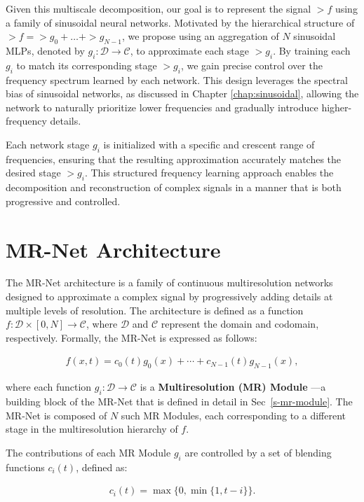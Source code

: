 Given this multiscale decomposition, our goal is to represent the signal $\gt{f}$ using a family of sinusoidal neural networks. Motivated by the hierarchical structure of $\gt{f}=\gt{g}_0+\dots+\gt{g}_{N-1}$, we propose using an aggregation of $N$ sinusoidal MLPs, denoted by $g_i:\mathcal{D}\to \mathcal{C}$, to approximate each stage $\gt{g}_i$. By training each $g_i$ to match its corresponding stage $\gt{g}_i$, we gain precise control over the frequency spectrum learned by each network. This design leverages the spectral bias of sinusoidal networks, as discussed in Chapter \ref{chap:sinusoidal}, allowing the network to naturally prioritize lower frequencies and gradually introduce higher-frequency details.

Each network stage $g_i$ is initialized with a specific and crescent range of frequencies, ensuring that the resulting approximation accurately matches the desired stage $\gt{g}_i$. This structured frequency learning approach enables the decomposition and reconstruction of complex signals in a manner that is both progressive and controlled.

\section{MR-Net Architecture}

The MR-Net architecture is a family of continuous multiresolution networks designed to approximate a complex signal by progressively adding details at multiple levels of resolution. The architecture is defined as a function \( f:\mathcal{D} \times [0,N] \to \mathcal{C} \), where \(\mathcal{D}\) and \(\mathcal{C}\) represent the domain and codomain, respectively. Formally, the MR-Net is expressed as follows:

\begin{align}\label{e-mrnet}
f(x,t) = c_0(t) g_0(x) + \cdots + c_{N-1}(t) g_{N-1}(x),
\end{align}

where each function \( g_i : \mathcal{D} \to \mathcal{C} \) is a \textbf{Multiresolution (MR) Module} —a building block of the MR-Net that is defined in detail in Sec~\ref{s-mr-module}. The MR-Net is composed of \( N \) such MR Modules, each corresponding to a different stage in the multiresolution hierarchy of \( f \). 

The contributions of each MR Module \( g_i \) are controlled by a set of blending functions \( c_i(t) \), defined as:

\begin{align}\label{e-control}
c_i(t) = \max \Big\{ 0, \min \big\{ 1, t - i \big\} \Big\}.
\end{align}

